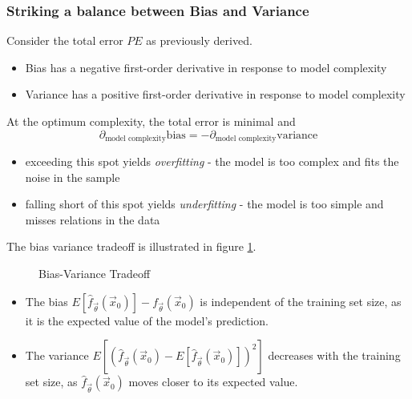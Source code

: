 \subsubsection{Striking a balance between Bias and Variance}
Consider the total error $PE$ as previously derived.
\begin{itemize}
    \item Bias has a negative first-order derivative in response to model complexity
    \item Variance has a positive first-order derivative in response to model complexity
\end{itemize}
At the optimum complexity, the total error is minimal and
\begin{equation}
    \partial_{\text{model complexity}} \text{bias} = - \partial_{\text{model complexity}} \text{variance}
\end{equation}
\begin{itemize}
    \item exceeding this spot yields \textit{overfitting} - the model is too complex and fits the noise in the sample
    \item falling short of this spot yields \textit{underfitting} - the model is too simple and misses relations in the data
\end{itemize}
The bias variance tradeoff is illustrated in figure \ref{fig:bias_variance_tradeoffA}.

\begin{figure}[!htb]
    \centering
    
    \caption{Bias-Variance Tradeoff}
    \label{fig:bias_variance_tradeoffA}
\end{figure}

\begin{itemize}
    \item The bias $E\left[ \hat{f}_\vec{\theta}(\vec{x}_0) \right] - f_\vec{\theta}(\vec{x}_0)$ is independent of the training set size, as it is the expected value of the model's prediction.
    \item The variance $E\left[ \left( \hat{f}_\vec{\theta}(\vec{x}_0) - E\left[ \hat{f}_\vec{\theta}(\vec{x}_0) \right] \right)^2 \right]$ decreases with the training set size, as $\hat{f}_\vec{\theta}(\vec{x}_0)$ moves closer to its expected value.
\end{itemize}

